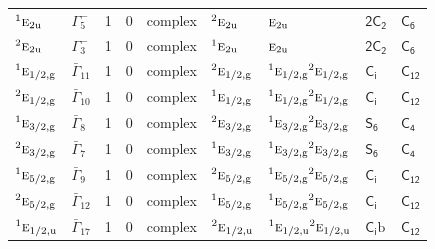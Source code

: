 \documentclass[10pt,a4paper]{article}
\makeatletter
\def\grouprule#1#2{\noalign{\marks\LTgroupmarks{\the\belowrulesep}\nobreak\vskip#1%
  \vskip\aboverulesep}\multispan\LT@cols\unskip{\leaders\hrule\@height#2\hfill\kern\z@}\cr
  \noalign{\penalty\LTrulebreak\vskip\belowrulesep\global\@lastruleclass\z@}}
\numberwithin{equation}{section}
\newcommand{\grp}[1]{\mathsf{#1}}
\newcommand{\irr}[1]{\text{\normalfont\scshape #1}}
\newcommand{\conjpair}[1]{{}^{#1}}
\newcommand{\ptag}[1]{\mathrm{#1}}
\newcommand{\secondclass}{\mathrm{b}}
\makeatother
\begin{document}
{\begin{longtable}{@{}llrrlllll@{}}
$\conjpair{1}\irr{e}_{2\ptag{u}}$ & $\Gamma_{5}^{-}$ & 1 & $0$ & complex & $\conjpair{2}\irr{e}_{2\ptag{u}}$ & $\irr{e}_{2\ptag{u}}$ & \href{2C2.pdf}{$\grp{2C_{2}}$} & \href{../../../rotation/data/pdf/C6.pdf}{$\grp{C_{6}}$}\\
$\conjpair{2}\irr{e}_{2\ptag{u}}$ & $\Gamma_{3}^{-}$ & 1 & $0$ & complex & $\conjpair{1}\irr{e}_{2\ptag{u}}$ & $\irr{e}_{2\ptag{u}}$ & \href{2C2.pdf}{$\grp{2C_{2}}$} & \href{../../../rotation/data/pdf/C6.pdf}{$\grp{C_{6}}$}\\
\grouprule{0pt}{\lightrulewidth}
$\conjpair{1}\irr{e}_{1/2,\ptag{g}}$ & $\bar{\Gamma}_{11}$ & 1 & $0$ & complex & $\conjpair{2}\irr{e}_{1/2,\ptag{g}}$ & $\conjpair{1}\irr{e}_{1/2,\ptag{g}}\conjpair{2}\irr{e}_{1/2,\ptag{g}}$ & \href{S2.pdf}{$\grp{C_{i}}$} & \href{../../../rotation/data/pdf/C12.pdf}{$\grp{C_{12}}$}\\
$\conjpair{2}\irr{e}_{1/2,\ptag{g}}$ & $\bar{\Gamma}_{10}$ & 1 & $0$ & complex & $\conjpair{1}\irr{e}_{1/2,\ptag{g}}$ & $\conjpair{1}\irr{e}_{1/2,\ptag{g}}\conjpair{2}\irr{e}_{1/2,\ptag{g}}$ & \href{S2.pdf}{$\grp{C_{i}}$} & \href{../../../rotation/data/pdf/C12.pdf}{$\grp{C_{12}}$}\\
$\conjpair{1}\irr{e}_{3/2,\ptag{g}}$ & $\bar{\Gamma}_{8}$ & 1 & $0$ & complex & $\conjpair{2}\irr{e}_{3/2,\ptag{g}}$ & $\conjpair{1}\irr{e}_{3/2,\ptag{g}}\conjpair{2}\irr{e}_{3/2,\ptag{g}}$ & \href{S6.pdf}{$\grp{S_{6}}$} & \href{../../../rotation/data/pdf/C4.pdf}{$\grp{C_{4}}$}\\
$\conjpair{2}\irr{e}_{3/2,\ptag{g}}$ & $\bar{\Gamma}_{7}$ & 1 & $0$ & complex & $\conjpair{1}\irr{e}_{3/2,\ptag{g}}$ & $\conjpair{1}\irr{e}_{3/2,\ptag{g}}\conjpair{2}\irr{e}_{3/2,\ptag{g}}$ & \href{S6.pdf}{$\grp{S_{6}}$} & \href{../../../rotation/data/pdf/C4.pdf}{$\grp{C_{4}}$}\\
$\conjpair{1}\irr{e}_{5/2,\ptag{g}}$ & $\bar{\Gamma}_{9}$ & 1 & $0$ & complex & $\conjpair{2}\irr{e}_{5/2,\ptag{g}}$ & $\conjpair{1}\irr{e}_{5/2,\ptag{g}}\conjpair{2}\irr{e}_{5/2,\ptag{g}}$ & \href{S2.pdf}{$\grp{C_{i}}$} & \href{../../../rotation/data/pdf/C12.pdf}{$\grp{C_{12}}$}\\
$\conjpair{2}\irr{e}_{5/2,\ptag{g}}$ & $\bar{\Gamma}_{12}$ & 1 & $0$ & complex & $\conjpair{1}\irr{e}_{5/2,\ptag{g}}$ & $\conjpair{1}\irr{e}_{5/2,\ptag{g}}\conjpair{2}\irr{e}_{5/2,\ptag{g}}$ & \href{S2.pdf}{$\grp{C_{i}}$} & \href{../../../rotation/data/pdf/C12.pdf}{$\grp{C_{12}}$}\\
$\conjpair{1}\irr{e}_{1/2,\ptag{u}}$ & $\bar{\Gamma}_{17}$ & 1 & $0$ & complex & $\conjpair{2}\irr{e}_{1/2,\ptag{u}}$ & $\conjpair{1}\irr{e}_{1/2,\ptag{u}}\conjpair{2}\irr{e}_{1/2,\ptag{u}}$ & \href{S2b.pdf}{$\grp{C_{i}}\secondclass$} & \href{../../../rotation/data/pdf/C12.pdf}{$\grp{C_{12}}$}\\

\end{longtable}}
\end{document}
